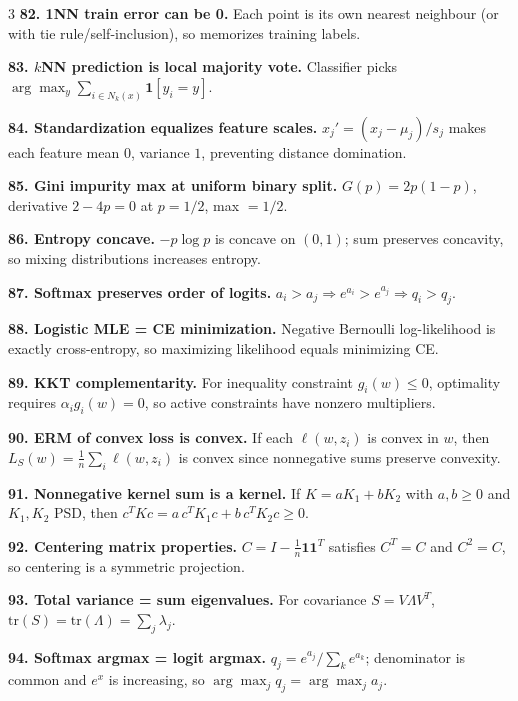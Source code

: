 \documentclass[8pt,fleqn]{extarticle}
\begin{document}
\begin{multicols}{3}
\textbf{82. 1NN train error can be 0.} Each point is its own nearest neighbour (or with tie rule/self-inclusion), so memorizes training labels.

\textbf{83. $k$NN prediction is local majority vote.} Classifier picks $\arg\max_y \sum_{i\in N_k(x)}\mathbf1[y_i=y]$.

\textbf{84. Standardization equalizes feature scales.} $x_j'=(x_j-\mu_j)/s_j$ makes each feature mean $0$, variance $1$, preventing distance domination.

\textbf{85. Gini impurity max at uniform binary split.} $G(p)=2p(1-p)$, derivative $2-4p=0$ at $p=1/2$, max $=1/2$.

\textbf{86. Entropy concave.} $-p\log p$ is concave on $(0,1)$; sum preserves concavity, so mixing distributions increases entropy.

\textbf{87. Softmax preserves order of logits.} $a_i>a_j \Rightarrow e^{a_i}>e^{a_j}\Rightarrow q_i>q_j$.

\textbf{88. Logistic MLE = CE minimization.} Negative Bernoulli log-likelihood is exactly cross-entropy, so maximizing likelihood equals minimizing CE.

\textbf{89. KKT complementarity.} For inequality constraint $g_i(w)\le0$, optimality requires $\alpha_i g_i(w)=0$, so active constraints have nonzero multipliers.

\textbf{90. ERM of convex loss is convex.} If each $\ell(w,z_i)$ is convex in $w$, then $L_S(w)=\frac1n\sum_i \ell(w,z_i)$ is convex since nonnegative sums preserve convexity.

\textbf{91. Nonnegative kernel sum is a kernel.} If $K=aK_1+bK_2$ with $a,b\ge0$ and $K_1,K_2$ PSD, then $c^TKc=a\,c^TK_1c+b\,c^TK_2c\ge0$.

\textbf{92. Centering matrix properties.} $C=I-\frac1n\mathbf1\mathbf1^T$ satisfies $C^T=C$ and $C^2=C$, so centering is a symmetric projection.

\textbf{93. Total variance = sum eigenvalues.} For covariance $S=V\Lambda V^T$, $\mathrm{tr}(S)=\mathrm{tr}(\Lambda)=\sum_j\lambda_j$.

\textbf{94. Softmax argmax = logit argmax.} $q_j=e^{a_j}/\sum_k e^{a_k}$; denominator is common and $e^x$ is increasing, so $\arg\max_j q_j=\arg\max_j a_j$.

\end{multicols}
\end{document}
